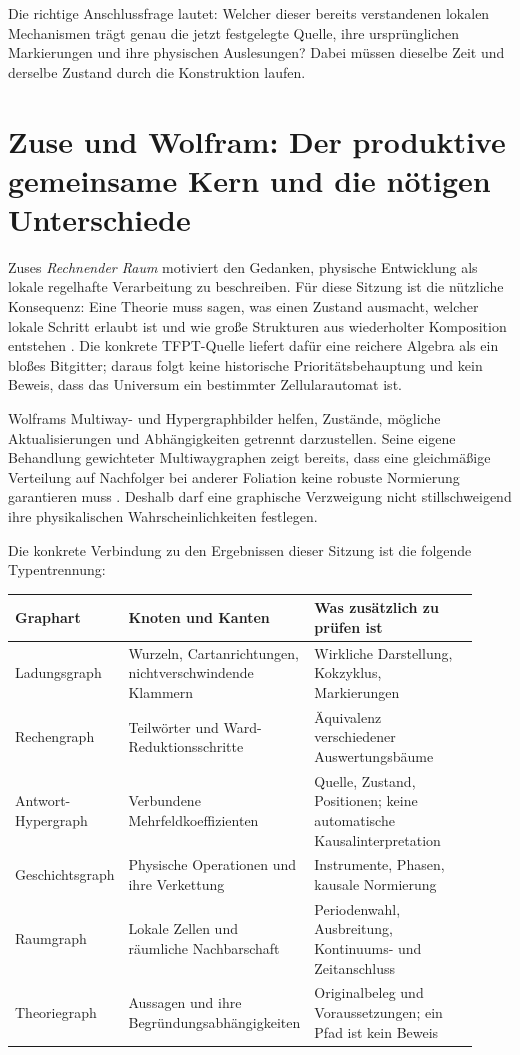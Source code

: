 Die richtige Anschlussfrage lautet: Welcher dieser bereits verstandenen lokalen Mechanismen trägt genau die jetzt festgelegte Quelle, ihre ursprünglichen Markierungen und ihre physischen Auslesungen? Dabei müssen dieselbe Zeit und derselbe Zustand durch die Konstruktion laufen.

\section{Zuse und Wolfram: Der produktive gemeinsame Kern und die nötigen Unterschiede}

Zuses \emph{Rechnender Raum} motiviert den Gedanken, physische Entwicklung als lokale regelhafte Verarbeitung zu beschreiben. Für diese Sitzung ist die nützliche Konsequenz: Eine Theorie muss sagen, was einen Zustand ausmacht, welcher lokale Schritt erlaubt ist und wie große Strukturen aus wiederholter Komposition entstehen \cite{zuse}. Die konkrete TFPT-Quelle liefert dafür eine reichere Algebra als ein bloßes Bitgitter; daraus folgt keine historische Prioritätsbehauptung und kein Beweis, dass das Universum ein bestimmter Zellularautomat ist.

Wolframs Multiway- und Hypergraphbilder helfen, Zustände, mögliche Aktualisierungen und Abhängigkeiten getrennt darzustellen. Seine eigene Behandlung gewichteter Multiwaygraphen zeigt bereits, dass eine gleichmäßige Verteilung auf Nachfolger bei anderer Foliation keine robuste Normierung garantieren muss \cite{wolfram}. Deshalb darf eine graphische Verzweigung nicht stillschweigend ihre physikalischen Wahrscheinlichkeiten festlegen.

Die konkrete Verbindung zu den Ergebnissen dieser Sitzung ist die folgende Typentrennung:
\begin{longtable}{L{0.21\linewidth}L{0.34\linewidth}L{0.37\linewidth}}
\toprule
Graphart & Knoten und Kanten & Was zusätzlich zu prüfen ist\\\midrule\endhead
Ladungsgraph & Wurzeln, Cartanrichtungen, nichtverschwindende Klammern & Wirkliche Darstellung, Kokzyklus, Markierungen\\
Rechengraph & Teilwörter und Ward-Reduktionsschritte & Äquivalenz verschiedener Auswertungsbäume\\
Antwort-Hypergraph & Verbundene Mehrfeldkoeffizienten & Quelle, Zustand, Positionen; keine automatische Kausalinterpretation\\
Geschichtsgraph & Physische Operationen und ihre Verkettung & Instrumente, Phasen, kausale Normierung\\
Raumgraph & Lokale Zellen und räumliche Nachbarschaft & Periodenwahl, Ausbreitung, Kontinuums- und Zeitanschluss\\
Theoriegraph & Aussagen und ihre Begründungsabhängigkeiten & Originalbeleg und Voraussetzungen; ein Pfad ist kein Beweis\\\bottomrule
\end{longtable}

